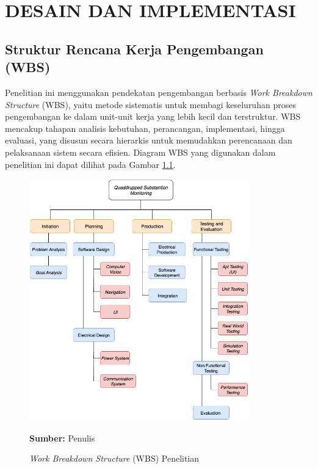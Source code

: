 \chapter{DESAIN DAN IMPLEMENTASI}
\label{chap:desainimplementasi}


\section{Struktur Rencana Kerja Pengembangan (WBS)}
\sloppy
Penelitian ini menggunakan pendekatan pengembangan berbasis \emph{Work Breakdown Structure} (WBS), yaitu metode sistematis untuk membagi keseluruhan proses pengembangan ke dalam unit-unit kerja yang lebih kecil dan terstruktur. WBS mencakup tahapan analisis kebutuhan, perancangan, implementasi, hingga evaluasi, yang disusun secara hierarkis untuk memudahkan perencanaan dan pelaksanaan sistem secara efisien. Diagram WBS yang digunakan dalam penelitian ini dapat dilihat pada Gambar \ref{fig:wbs}.

\begin{figure}[H]
  \centering
  \includegraphics[width=0.85\textwidth]{gambar/bab3/wbs-ta.png}
  \caption{\emph{Work Breakdown Structure} (WBS) Penelitian}
  \label{fig:wbs}
  \footnotesize{\textbf{Sumber:} Penulis}
\end{figure}

